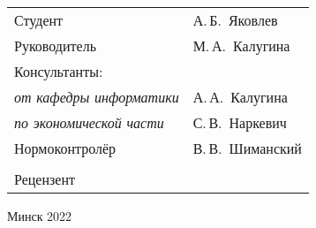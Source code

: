 \begin{titlepage}
\begin{center}
    \begin{tabular}{ p{}p{} }
      Студент & А.\,Б.~Яковлев \\
      Руководитель & М.\,А.~Калугина \\
      Консультанты: &\\
      \hspace*{3ex}\emph{от кафедры информатики} & А.\,А.~Калугина \\
      \hspace*{3ex}\emph{по экономической части} & С.\,В.~Наркевич \\
      Нормоконтролёр & В.\,В.~Шиманский\\
      & \\
      Рецензент &
    \end{tabular}
    
    \vfill
    {\normalsize Минск 2022}
  \end{center}
\end{titlepage}
